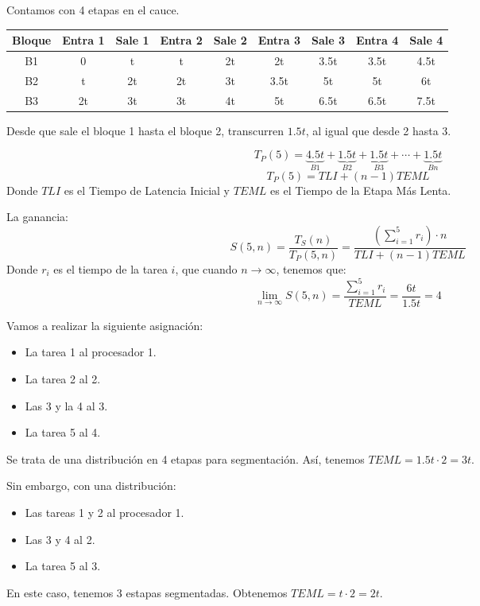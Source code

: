 \begin{ejercicio}
\begin{enumerate}
    Contamos con 4 etapas en el cauce.
\begin{table}[H]
\begin{tabular}{|c|c|c|c|c|c|c|c|c|}
    \hline
    Bloque & Entra 1 & Sale 1 & Entra 2 & Sale 2 & Entra 3 & Sale 3 & Entra 4 & Sale 4 \\
    \hline
    B1 & 0 & t & t & 2t & 2t & 3.5t & 3.5t & 4.5t \\
    B2 & t & 2t & 2t & 3t & 3.5t & 5t & 5t & 6t \\
    B3 & 2t & 3t & 3t & 4t & 5t & 6.5t & 6.5t & 7.5t\\
    \hline
\end{tabular}
\end{table}
Desde que sale el bloque 1 hasta el bloque 2, transcurren $1.5t$, al igual que desde 2 hasta 3.

\begin{equation*}
    T_P(5) = \underbrace{4.5t}_{B1} + \underbrace{1.5t}_{B2} + \underbrace{1.5t}_{B3} + \cdots + \underbrace{1.5t}_{Bn}
\end{equation*}
\begin{equation*}
    T_P(5) = TLI + (n-1)TEML
\end{equation*}
Donde $TLI$ es el Tiempo de Latencia Inicial y $TEML$ es el Tiempo de la Etapa Más Lenta.

La ganancia:
\begin{equation*}
    S(5,n) = \dfrac{T_S(n)}{T_P(5,n)} = \dfrac{\left(\sum\limits_{i=1}^{5}r_i \right)\cdot n}{TLI + (n-1)TEML}
\end{equation*}
Donde $r_i$ es el tiempo de la tarea $i$, que cuando $n\rightarrow\infty$, tenemos que:
\begin{equation*}
    \lim_{n\to\infty}S(5,n) = \dfrac{\sum\limits_{i=1}^{5}r_i}{TEML} = \dfrac{6t}{1.5t} = 4
\end{equation*}

Vamos a realizar la siguiente asignación:
    \begin{itemize}
        \item La tarea 1 al procesador 1.
        \item La tarea 2 al 2.
        \item Las 3 y la 4 al 3.
        \item La tarea 5 al 4.
    \end{itemize}
    Se trata de una distribución en 4 etapas para segmentación. Así, tenemos $TEML = 1.5t\cdot 2=3t$.

    Sin embargo, con una distribución:
    \begin{itemize}
        \item Las tareas 1 y 2 al procesador 1.
        \item Las 3 y 4 al 2.
        \item La tarea 5 al 3.
    \end{itemize}
    En este caso, tenemos 3 estapas segmentadas. Obtenemos $TEML = t\cdot 2 = 2t$.
    
\end{enumerate}



\end{ejercicio}


